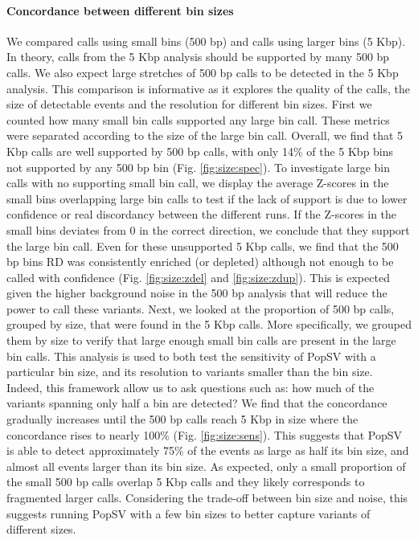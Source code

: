 \paragraph{Concordance between different bin sizes}
We compared calls using small bins (500 bp) and calls using larger bins (5 Kbp). In theory, calls from the 5 Kbp analysis should be supported by many 500 bp calls. We also expect large stretches of 500 bp calls to be detected in the 5 Kbp analysis. This comparison is informative as it explores the quality of the calls, the size of detectable events and the resolution for different bin sizes. First we counted how many small bin calls supported any large bin call. These metrics were separated according to the size of the large bin call. Overall, we find that 5 Kbp calls are well supported by 500 bp calls, with only 14\% of the 5 Kbp bins not supported by any 500 bp bin (Fig. \ref{fig:size:spec}). To investigate large bin calls with no supporting small bin call, we display the average Z-scores in the small bins overlapping large bin calls to test if the lack of support is due to lower confidence or real discordancy between the different runs. If the Z-scores in the small bins deviates from 0 in the correct direction, we conclude that they support the large bin call. Even for these unsupported 5 Kbp calls, we find that the 500 bp bins RD was consistently enriched (or depleted) although not enough to be called with confidence (Fig. \ref{fig:size:zdel} and \ref{fig:size:zdup}). This is expected given the higher background noise in the 500 bp analysis that will reduce the power to call these variants. Next, we looked at the proportion of 500 bp calls, grouped by size, that were found in the 5 Kbp calls. More specifically, we grouped them by size to verify that large enough small bin calls are present in the large bin calls. This analysis is used to both test the sensitivity of {\sf PopSV} with a particular bin size, and its resolution to variants smaller than the bin size. Indeed, this framework allow us to ask questions such as: how much of the variants spanning only half a bin are detected? We find that the concordance gradually increases until the 500 bp calls reach 5 Kbp in size where the concordance rises to nearly 100\% (Fig. \ref{fig:size:sens}). This suggests that {\sf PopSV} is able to detect approximately 75\% of the events as large as half its bin size, and almost all events larger than its bin size. As expected, only a small proportion of the small 500 bp calls overlap 5 Kbp calls and they likely corresponds to fragmented larger calls. Considering the trade-off between bin size and noise, this suggests running {\sf PopSV} with a few bin sizes to better capture variants of different sizes.

